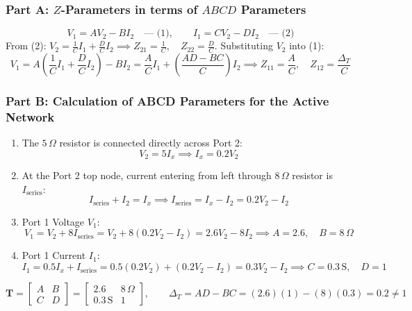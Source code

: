 \documentclass[11pt,a4paper,oneside]{article}
\begin{document}
\subsubsection*{Part A: $Z$-Parameters in terms of $ABCD$ Parameters}
\[
V_1 = A V_2 - B I_2 \quad \text{--- (1)}, \qquad I_1 = C V_2 - D I_2 \quad \text{--- (2)}
\]
From (2): $V_2 = \frac{1}{C} I_1 + \frac{D}{C} I_2 \implies Z_{21} = \frac{1}{C}, \quad Z_{22} = \frac{D}{C}$.
Substituting $V_2$ into (1):
\[
V_1 = A\left(\frac{1}{C} I_1 + \frac{D}{C} I_2\right) - B I_2 = \frac{A}{C} I_1 + \left(\frac{AD - BC}{C}\right) I_2 \implies Z_{11} = \frac{A}{C}, \quad Z_{12} = \frac{\Delta_T}{C}
\]

\subsubsection*{Part B: Calculation of ABCD Parameters for the Active Network}
\begin{enumerate}[leftmargin=1.5em]
  \item The $5\,\Omega$ resistor is connected directly across Port 2:
  \begin{equation}
    V_2 = 5 I_x \implies I_x = 0.2 V_2
  \end{equation}
  \item At the Port 2 top node, current entering from left through $8\,\Omega$ resistor is $I_{\text{series}}$:
  \begin{equation}
    I_{\text{series}} + I_2 = I_x \implies I_{\text{series}} = I_x - I_2 = 0.2 V_2 - I_2
  \end{equation}
  \item Port 1 Voltage $V_1$:
  \begin{equation}
    V_1 = V_2 + 8 I_{\text{series}} = V_2 + 8(0.2 V_2 - I_2) = 2.6 V_2 - 8 I_2 \implies A = 2.6, \quad B = 8\,\Omega
  \end{equation}
  \item Port 1 Current $I_1$:
  \begin{equation}
    I_1 = 0.5 I_x + I_{\text{series}} = 0.5(0.2 V_2) + (0.2 V_2 - I_2) = 0.3 V_2 - I_2 \implies C = 0.3\,\mathrm{S}, \quad D = 1
  \end{equation}
\end{enumerate}

\begin{answerbox}
\[
\mathbf{T} = \begin{bmatrix} A & B \\ C & D \end{bmatrix} = \begin{bmatrix} 2.6 & 8\,\Omega \\ 0.3\,\mathrm{S} & 1 \end{bmatrix}, \qquad \Delta_T = AD - BC = (2.6)(1) - (8)(0.3) = 0.2 \ne 1
\]
\end{answerbox}
\end{document}
